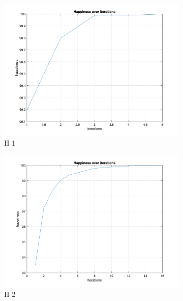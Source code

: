 \documentclass[unicode,11pt,a4paper,oneside,numbers=endperiod,openany]{scrartcl}
\begin{document}
\begin{figure}[H]
    \centering
    \begin{subfigure}[b]{0.45\textwidth}
        
      \includegraphics[width=\textwidth]{Convergence/ConvergenceH1Random_1.png}
      \caption{H 1}
      \label{fig:image10}
    \end{subfigure}
    \begin{subfigure}[b]{0.45\textwidth}
        \includegraphics[width=\textwidth]{Convergence/ConvergenceH2Random_1.png}
        \caption{H 2}
        \label{fig:image11}
    \end{subfigure}
    \begin{subfigure}[b]{0.45\textwidth}
        

\end{subfigure}
\end{figure}
\end{document}
